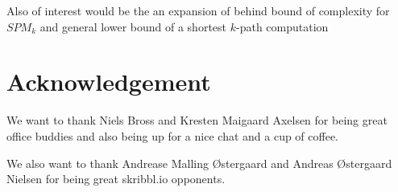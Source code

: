 Also of interest would be the an expansion of behind bound of complexity for $SPM_k$ and general lower bound of a shortest $k$-path computation


\section*{Acknowledgement}

We want to thank Niels Bross and Kresten Maigaard Axelsen for being great office buddies and also being up for a nice chat and a cup of coffee. 

We also want to thank Andrease Malling Østergaard and Andreas Østergaard Nielsen for being great skribbl.io opponents. 

